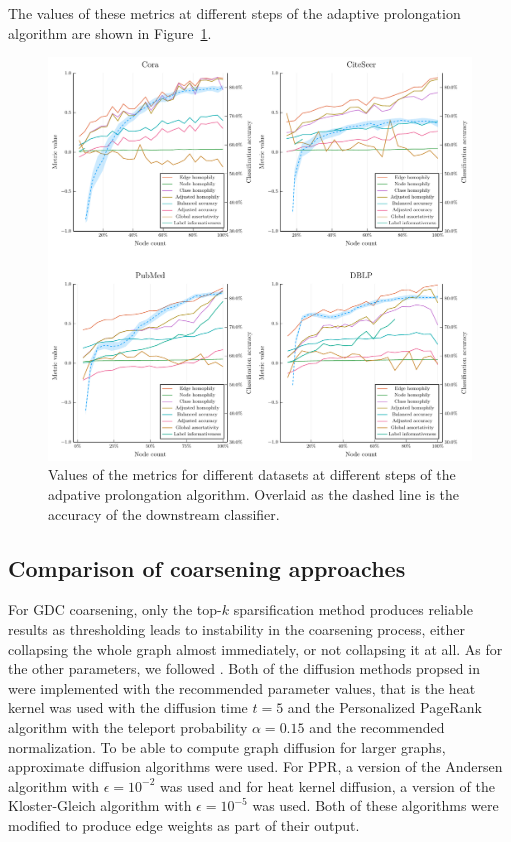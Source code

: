 The values of these metrics at different steps of the adaptive prolongation algorithm are shown in Figure~\ref{fig:metrics}.

\begin{figure}
  \centering
  \includegraphics[width = \linewidth]{images/metrics/metrics.pdf}
  \caption{Values of the metrics for different datasets at different steps of the adpative prolongation algorithm. Overlaid as the dashed line is the accuracy of the downstream classifier.}
  \label{fig:metrics}
\end{figure}

\subsection{Comparison of coarsening approaches}

For GDC coarsening, only the top-\( k \) sparsification method produces reliable results as thresholding leads to instability in the coarsening process, either collapsing the whole graph almost immediately, or not collapsing it at all. As for the other parameters, we followed \cite{gasteiger_diffusion_2019}. Both of the diffusion methods propsed in \cite{gasteiger_diffusion_2019} were implemented with the recommended parameter values, that is the heat kernel was used with the diffusion time \( t = 5 \) and the Personalized PageRank algorithm with the teleport probability \( \alpha = 0.15 \) and the recommended normalization. To be able to compute graph diffusion for larger graphs, approximate diffusion algorithms were used. For PPR, a version of the Andersen algorithm \cite{andersen_local_2006} with \( \epsilon = 10^{-2} \) was used and for heat kernel diffusion, a version of the Kloster-Gleich algorithm \cite{kloster_heat_2014} with \( \epsilon = 10^{-5} \) was used. Both of these algorithms were modified to produce edge weights as part of their output.

